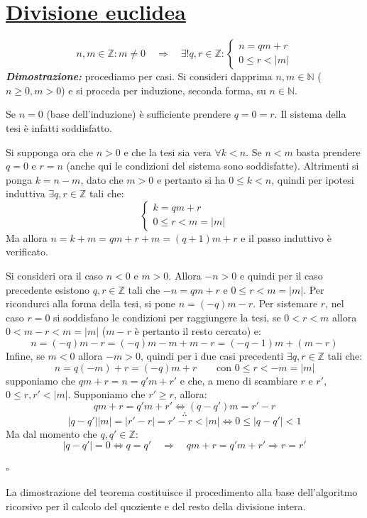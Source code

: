 \documentclass[oneside]{book}
\theoremstyle{remark}
\newcommand{\teorema}[1]{\section{\underline{#1}}}
\newcommand{\cvd}{\begin{flushright}$\square$\end{flushright}} %
\begin{document}
\teorema{Divisione euclidea}
\begin{tcolorbox}[title={Teorema della divisione euclidea}]
\[
    n,m \in \mathbb{Z}: m\not=0 \quad \Longrightarrow \quad \exists! q,r\in \mathbb{Z}:
    \begin{cases}
        n = qm + r\\
        0 \leq r < |m|
    \end{cases}
\]
\emph{\textbf{Dimostrazione:}}  procediamo
per casi. Si consideri dapprima $n,m \in \mathbb{N}$ ($n \geq 0, m > 0$)
e si proceda per induzione, seconda forma, su $n\in\mathbb{N}$.

Se $n = 0$ (base dell'induzione) è sufficiente prendere $q = 0 = r$. Il
sistema della tesi è infatti soddisfatto.

Si supponga ora che $n > 0$ e che la tesi sia vera $\forall k < n$.
Se $n < m$ basta prendere $q = 0$ e $r = n$ (anche qui le condizioni
del sistema sono soddisfatte). Altrimenti si ponga $k = n - m$, dato
che $m > 0$ e pertanto si ha $0 \leq k < n$,
quindi per ipotesi induttiva $\exists q,r \in \mathbb{Z}$ tali che:
\[ 
    \begin{cases}
        k = qm + r\\
        0 \leq r < m = |m|
    \end{cases}
\]
Ma allora $n = k + m = qm + r + m = (q+1)m + r$ e il passo induttivo
è verificato.

Si consideri ora il caso $n < 0$ e $m > 0$. Allora $-n > 0$ e quindi
per il caso precedente esistono $q,r \in \mathbb{Z}$ tali che
$-n = qm + r$ e $0 \leq r < m = |m|$. Per ricondurci alla forma della
tesi, si pone $n = (-q)m - r$. Per sistemare $r$, nel caso $r = 0$ si
soddisfano le condizioni per raggiungere la tesi, se $0 < r < m$ allora
$0 < m - r < m = |m|$ ($m - r$ è pertanto il resto cercato) e:
\[ n = (-q)m - r = (-q)m - m + m - r = (-q - 1)m + (m - r) \]
Infine, se $m < 0$ allora $-m > 0$, quindi per i due casi precedenti
$\exists q,r \in \mathbb{Z}$ tali che:
\[ n = q(-m) + r = (-q)m + r \qquad \text{con } 0 \leq r < -m = |m| \]
 supponiamo che
$qm + r = n = q'm + r'$ e che, a meno di scambiare $r$ e $r'$, $0 \leq r,r' < |m|$.
Supponiamo che $r' \geq r$, allora:
\[ qm + r = q'm + r' \Longleftrightarrow (q - q')m = r'-r \]
\[ \therefore \]
\[ |q-q'||m| = |r'-r| = r'-r < |m| \Longleftrightarrow 0 \leq |q-q'| < 1 \]
Ma dal momento che $q,q' \in \mathbb{Z}$:
\[
    |q-q'| = 0 \Longleftrightarrow q = q' \quad \Longrightarrow \quad qm + r = q'm + r' \Longrightarrow r = r'
\]

\cvd
\end{tcolorbox}
La dimostrazione del teorema costituisce il procedimento alla base
dell'algoritmo ricorsivo per il calcolo del quoziente e del resto
della divisione intera.
\begin{tcolorbox}[colback=red!30, colframe=red!30!black, title=Algoritmo di divisione euclidea]

\end{tcolorbox}
\end{document}
